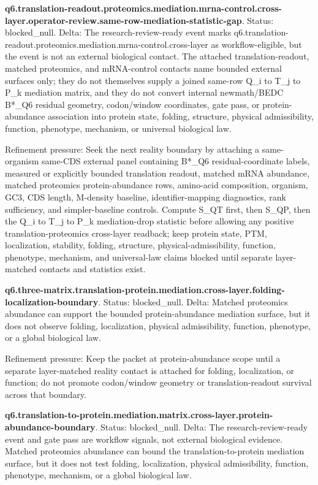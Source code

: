 \textbf{q6.translation-readout.proteomics.mediation.mrna-control.cross-layer.operator-review.same-row-mediation-statistic-gap}. Status: blocked\_null. Delta: The research-review-ready event marks q6.translation-readout.proteomics.mediation.mrna-control.cross-layer as workflow-eligible, but the event is not an external biological contact. The attached translation-readout, matched proteomics, and mRNA-control contacts name bounded external surfaces only; they do not themselves supply a joined same-row Q\_i to T\_j to P\_k mediation matrix, and they do not convert internal newmath/BEDC B*\_Q6 residual geometry, codon/window coordinates, gate pass, or protein-abundance association into protein state, folding, structure, physical admissibility, function, phenotype, mechanism, or universal biological law.

Refinement pressure: Seek the next reality boundary by attaching a same-organism same-CDS external panel containing B*\_Q6 residual-coordinate labels, measured or explicitly bounded translation readout, matched mRNA abundance, matched proteomics protein-abundance rows, amino-acid composition, organism, GC3, CDS length, M-density baseline, identifier-mapping diagnostics, rank sufficiency, and simpler-baseline controls. Compute S\_QT first, then S\_QP, then the Q\_i to T\_j to P\_k mediation-drop statistic before allowing any positive translation-proteomics cross-layer readback; keep protein state, PTM, localization, stability, folding, structure, physical-admissibility, function, phenotype, mechanism, and universal-law claims blocked until separate layer-matched contacts and statistics exist.

\textbf{q6.three-matrix.translation-protein.mediation.cross-layer.folding-localization-boundary}. Status: blocked\_null. Delta: Matched proteomics abundance can support the bounded protein-abundance mediation surface, but it does not observe folding, localization, physical admissibility, function, phenotype, or a global biological law.

Refinement pressure: Keep the packet at protein-abundance scope until a separate layer-matched reality contact is attached for folding, localization, or function; do not promote codon/window geometry or translation-readout survival across that boundary.

\textbf{q6.translation-to-protein.mediation.matrix.cross-layer.protein-abundance-boundary}. Status: blocked\_null. Delta: The research-review-ready event and gate pass are workflow signals, not external biological evidence. Matched proteomics abundance can bound the translation-to-protein mediation surface, but it does not test folding, localization, physical admissibility, function, phenotype, mechanism, or a global biological law.

